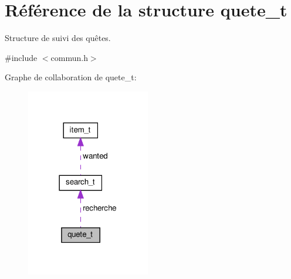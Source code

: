 \hypertarget{structquete__t}{}\section{Référence de la structure quete\+\_\+t}
\label{structquete__t}


Structure de suivi des quêtes.  




{\ttfamily \#include $<$commun.\+h$>$}



Graphe de collaboration de quete\+\_\+t\+:
\nopagebreak
\begin{figure}[H]
\begin{center}
\leavevmode
\includegraphics[width=153pt]{structquete__t__coll__graph}
\end{center}
\end{figure}
